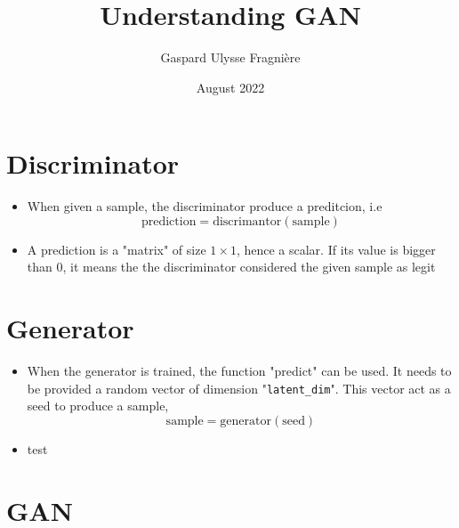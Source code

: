\documentclass{article}
\title{Understanding GAN}
\author{Gaspard Ulysse Fragnière}
\date{August 2022}
\begin{document}
\maketitle

\section{Discriminator}

\begin{itemize}
    \item When given a sample, the discriminator produce a preditcion, i.e
    \begin{equation}
        \text{prediction} = \text{discrimantor}(\text{sample})
    \end{equation}
    \item A prediction is a "matrix" of size $1 \times 1$, hence a scalar. If its value is bigger than 0, it means the the discriminator considered the given sample as legit
\end{itemize}

\section{Generator}

    

\begin{itemize}
    \item When the generator is trained, the function "predict" can be used. It needs to be provided a random vector of dimension "\lstinline{latent_dim}". This vector act as a seed to produce a sample,  
    \begin{equation}
        \text{sample} = \text{generator}(\text{seed})
    \end{equation}
    \item test
    
    
\end{itemize}


\section{GAN}
\end{document}
